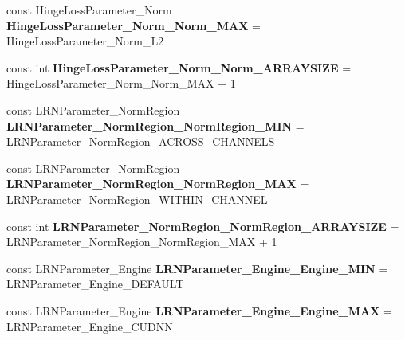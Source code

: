 \begin{DoxyCompactItemize}
\item 
\mbox{\label{namespacecaffe_a49f4192ffc396d3b7bde53f639c34f0f}} 
const Hinge\+Loss\+Parameter\+\_\+\+Norm {\bfseries Hinge\+Loss\+Parameter\+\_\+\+Norm\+\_\+\+Norm\+\_\+\+M\+AX} = Hinge\+Loss\+Parameter\+\_\+\+Norm\+\_\+\+L2
\item 
\mbox{\label{namespacecaffe_acfe6d564d0e04f3d98c53f0cb5f3c730}} 
const int {\bfseries Hinge\+Loss\+Parameter\+\_\+\+Norm\+\_\+\+Norm\+\_\+\+A\+R\+R\+A\+Y\+S\+I\+ZE} = Hinge\+Loss\+Parameter\+\_\+\+Norm\+\_\+\+Norm\+\_\+\+M\+AX + 1
\item 
\mbox{\label{namespacecaffe_a0c6f703310ba395751fd84d465e6e677}} 
const L\+R\+N\+Parameter\+\_\+\+Norm\+Region {\bfseries L\+R\+N\+Parameter\+\_\+\+Norm\+Region\+\_\+\+Norm\+Region\+\_\+\+M\+IN} = L\+R\+N\+Parameter\+\_\+\+Norm\+Region\+\_\+\+A\+C\+R\+O\+S\+S\+\_\+\+C\+H\+A\+N\+N\+E\+LS
\item 
\mbox{\label{namespacecaffe_a1e6e5e08dfa4c7802eb0fc467f664bd2}} 
const L\+R\+N\+Parameter\+\_\+\+Norm\+Region {\bfseries L\+R\+N\+Parameter\+\_\+\+Norm\+Region\+\_\+\+Norm\+Region\+\_\+\+M\+AX} = L\+R\+N\+Parameter\+\_\+\+Norm\+Region\+\_\+\+W\+I\+T\+H\+I\+N\+\_\+\+C\+H\+A\+N\+N\+EL
\item 
\mbox{\label{namespacecaffe_af9b5385d442f46fdb2f2639ff734fa5d}} 
const int {\bfseries L\+R\+N\+Parameter\+\_\+\+Norm\+Region\+\_\+\+Norm\+Region\+\_\+\+A\+R\+R\+A\+Y\+S\+I\+ZE} = L\+R\+N\+Parameter\+\_\+\+Norm\+Region\+\_\+\+Norm\+Region\+\_\+\+M\+AX + 1
\item 
\mbox{\label{namespacecaffe_a4eaf566eb9baea42e61ce08e931b4ac9}} 
const L\+R\+N\+Parameter\+\_\+\+Engine {\bfseries L\+R\+N\+Parameter\+\_\+\+Engine\+\_\+\+Engine\+\_\+\+M\+IN} = L\+R\+N\+Parameter\+\_\+\+Engine\+\_\+\+D\+E\+F\+A\+U\+LT
\item 
\mbox{\label{namespacecaffe_a4e32af80476052594bbbb08dc5cd6443}} 
const L\+R\+N\+Parameter\+\_\+\+Engine {\bfseries L\+R\+N\+Parameter\+\_\+\+Engine\+\_\+\+Engine\+\_\+\+M\+AX} = L\+R\+N\+Parameter\+\_\+\+Engine\+\_\+\+C\+U\+D\+NN
\item 
\mbox{\label{namespacecaffe_aba31178c2430727ef953dd0b8ded0399}} 

\end{DoxyCompactItemize}
